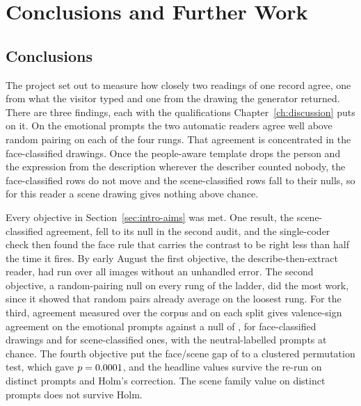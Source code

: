 \chapter{Conclusions and Further Work}
\label{ch:conclusion}

\section{Conclusions}
\label{sec:conc}

The project set out to measure how closely two readings of one record agree, one from what the visitor typed and one from the drawing the generator returned. There are three findings, each with the qualifications Chapter~\ref{ch:discussion} puts on it. On the \nEmotional{} emotional prompts the two automatic readers agree well above random pairing on each of the four rungs. That agreement is concentrated in the face-classified drawings. Once the people-aware template drops the person and the expression from the description wherever the describer counted nobody, the face-classified rows do not move and the scene-classified rows fall to their nulls, so for this reader a scene drawing gives nothing above chance.

Every objective in Section~\ref{sec:intro-aims} was met. One result, the scene-classified agreement, fell to its null in the second audit, and the single-coder check then found the face rule that carries the contrast to be right less than half the time it fires. By early August the first objective, the describe-then-extract reader, had run over all \nTotal{} images without an unhandled error. The second objective, a random-pairing null on every rung of the ladder, did the most work, since it showed that random pairs already average \FullNeuVaNull{} on the loosest rung. For the third, agreement measured over the corpus and on each split gives \FullEmoSignObs{} valence-sign agreement on the emotional prompts against a null of \FullEmoSignNull{}, \FullFaceSignObs{} for face-classified drawings and \FullSceneSignObs{} for scene-classified ones, with the neutral-labelled prompts at chance. The fourth objective put the face/scene gap of \DiffSignPp{} to a clustered permutation test, which gave $p = 0.0001{}$, and the headline values survive the re-run on distinct prompts and Holm's correction. The scene family value on distinct prompts does not survive Holm.

